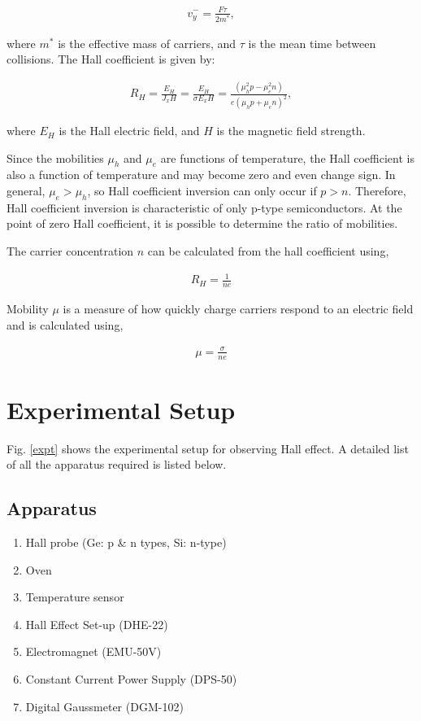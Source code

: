 \begin{align}
    v^-_y=\frac{F\tau}{2m^*},
    \label{eq:y_direction}
\end{align}

where $m^*$ is the effective mass of carriers, and $\tau$ is the mean time between collisions. The Hall coefficient is given by:

\begin{align}
    R_H=\frac{E_H}{J_xH}=\frac{E_H}{\sigma E_xH}=\frac{(\mu^2_hp-\mu^2_en)}{e(\mu_hp+\mu_en)^2},
    \label{eq:hall_coefficient}
\end{align}

where $E_H$ is the Hall electric field, and $H$ is the magnetic field strength.

Since the mobilities $\mu_h$ and $\mu_e$ are functions of temperature, the Hall coefficient is also a function of temperature and may become zero and even change sign. In general, $\mu_e > \mu_h$, so Hall coefficient inversion can only occur if $p > n$. Therefore, Hall coefficient inversion is characteristic of only p-type semiconductors. At the point of zero Hall coefficient, it is possible to determine the ratio of mobilities.

The carrier concentration $n$ can be calculated from the hall coefficient using,

\begin{align} \label{eq:6}
    R_H = \frac{1}{ne}
\end{align}

Mobility $\mu$ is a measure of how quickly charge
carriers respond to an electric field and is calculated
using,

\begin{align} \label{eq:7}
    \mu = \frac{\sigma}{ne}
\end{align}

\section{Experimental Setup}
Fig. \ref{expt} shows the experimental setup for observing Hall effect. A detailed list of all the apparatus required is listed below.

\subsection*{Apparatus}

\begin{enumerate}
    \item Hall probe (Ge: p \& n types, Si: n-type)
    \item Oven
    \item Temperature sensor
    \item Hall Effect Set-up (DHE-22)
    \item Electromagnet (EMU-50V)
    \item Constant Current Power Supply (DPS-50)
    \item Digital Gaussmeter (DGM-102)
\end{enumerate}


